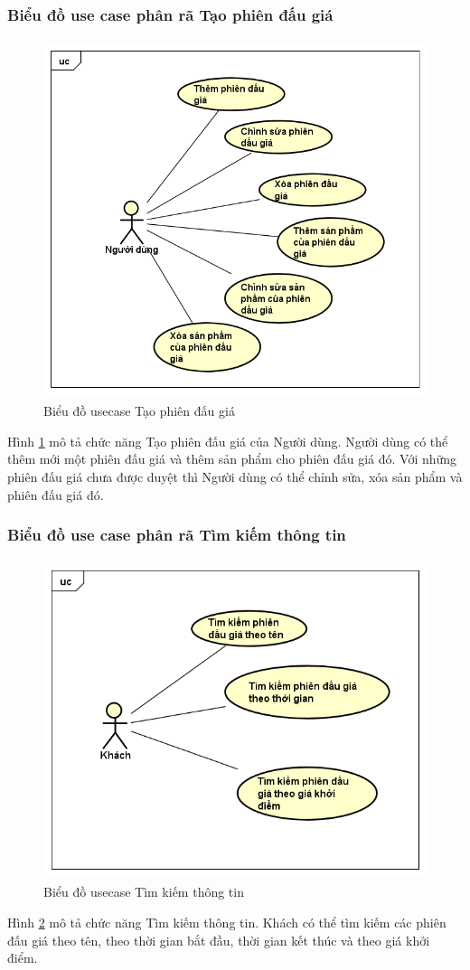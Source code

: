 \documentclass{article}
\begin{document}
\subsubsection{Biểu đồ use case phân rã Tạo phiên đấu giá}
\begin{figure}[H]
    \centering
    \includegraphics[width=11.4cm,height=10.49cm]{images/uc tạo phiên đấu giá.png}
    \caption{Biểu đồ usecase Tạo phiên đấu giá}
    \label{hinh24}
\end{figure}
Hình \ref{hinh24} mô tả chức năng Tạo phiên đấu giá của Người dùng. Người dùng có thể thêm mới một phiên đấu giá và thêm sản phẩm cho phiên đấu giá đó. Với những phiên đấu giá chưa được duyệt thì Người dùng có thể chỉnh sửa, xóa sản phẩm và phiên đấu giá đó.
\subsubsection{Biểu đồ use case phân rã Tìm kiếm thông tin}
\begin{figure}[H]
    \centering
    \includegraphics[width=11.4cm,height=9.35cm]{images/uc tìm kiếm thông tin.png}
    \caption{Biểu đồ usecase Tìm kiếm thông tin}
    \label{hinh25}
\end{figure}
Hình \ref{hinh25} mô tả chức năng Tìm kiếm thông tin. Khách có thể tìm kiếm các phiên đấu giá theo tên, theo thời gian bắt đầu, thời gian kết thúc và theo giá khởi điểm. 
\end{document}
